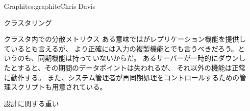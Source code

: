 \begin{aosachapter}{Graphite}{s:graphite}{Chris Davis}
\begin{aosasect1}{クラスタリング}
\begin{aosasect2}{クラスタ内での分散メトリクス}
ある意味ではがレプリケーション機能を提供しているとも言えるが、
より正確には入力の複製機能とでも言うべきだろう。というのも、同期機能は持っていないからだ。
あるサーバーが一時的にダウンしたとすると、その期間のデータポイントは失われるが、
それ以外の機能は正常に動作する。
また、システム管理者が再同期処理をコントロールするための管理スクリプトも用意されている。

\end{aosasect2}

\end{aosasect1}

\begin{aosasect1}{設計に関する重い}


\end{aosasect1}
\end{aosachapter}
